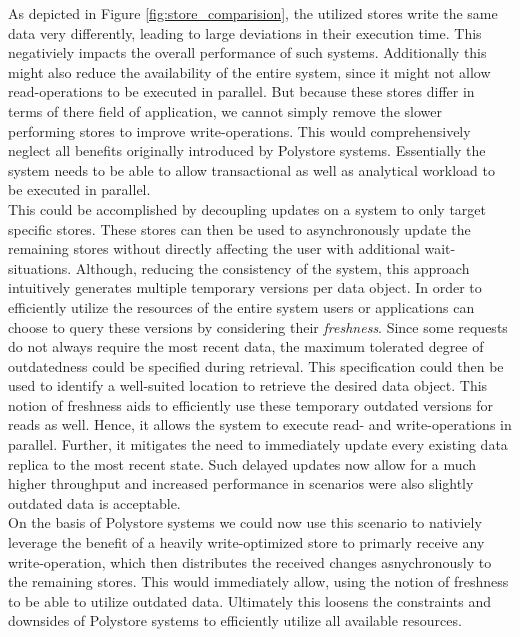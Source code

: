 As depicted in Figure \ref{fig:store_comparision}, the utilized stores write the same data very differently, leading to large deviations in their execution time. 
This negativiely impacts the overall performance of such systems.
Additionally this might also reduce the availability of the entire system, since it might not allow read-operations to be executed in parallel. 
But because these stores differ in terms of there field of application, we cannot simply remove the slower performing stores to improve write-operations. 
This would comprehensively neglect all benefits originally introduced by Polystore systems.
Essentially the system needs to be able to allow transactional as well as analytical workload to be executed in parallel.\\
This could be accomplished by decoupling updates on a system to only target specific stores. 
These stores can then be used to asynchronously update
the remaining stores without directly affecting the user with additional wait-situations.
Although, reducing the consistency of the system, this approach intuitively generates multiple temporary versions per data object.
In order to efficiently utilize the resources of the entire system users or applications can choose to query these versions by
considering their \emph{freshness}.
Since some requests do not always require the most recent data, the maximum tolerated degree of outdatedness could be specified during retrieval.
This specification could then be used to identify a well-suited location to retrieve the desired data object. 
This notion of freshness aids to efficiently use these temporary outdated versions for reads as well. 
Hence, it allows the system to execute read- and write-operations in parallel.
Further, it mitigates the need to immediately update every existing data replica to the most recent state.
Such delayed updates now allow for a much higher throughput and increased performance in scenarios were also slightly 
outdated data is acceptable.\\
On the basis of Polystore systems we could now use this scenario to nativiely leverage the benefit of a heavily write-optimized store to 
primarly receive any write-operation, which then distributes the received changes asnychronously to the remaining stores. This
would immediately allow, using the notion of freshness to be able to utilize outdated data.
Ultimately this loosens the constraints and downsides of Polystore systems to efficiently utilize all available resources.



